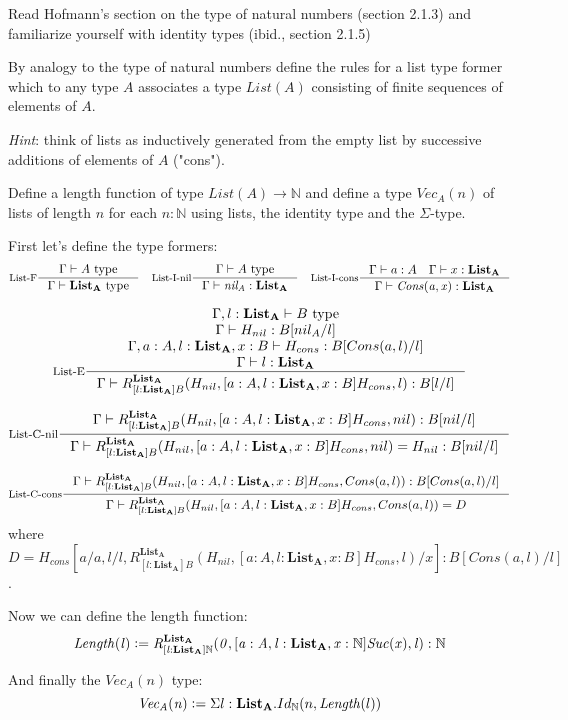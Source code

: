 \begin{exercise}
  Read Hofmann's section on the type of natural numbers (section 2.1.3) and
  familiarize yourself with identity types (ibid., section 2.1.5)

  By analogy to the type of natural numbers define the rules for a list type
  former which to any type $A$ associates a type $\mathit{List}(A)$ consisting
  of finite sequences of elements of $A$.

  \emph{Hint}: think of lists as inductively generated from the empty list by
  successive additions of elements of $A$ ("cons").

  Define a length function of type $\mathit{List}(A) \to \mathbb{N}$ and define
  a type $\mathit{Vec}_A(n)$ of lists of length $n$ for each $n : \mathbb{N}$
  using lists, the identity type and the $\Sigma$-type.
\end{exercise}
\begin{answer}
  First let's define the type formers:
  \[
    \inference[List-F]{\Gamma \vdash A ~\text{type}}{\Gamma \vdash \mathbf{List_A} ~\text{type}}\quad
    \inference[List-I-nil]{\Gamma \vdash A ~\text{type}}{\Gamma \vdash \mathit{nil_A} : \mathbf{List_A}}\quad
    \inference[List-I-cons]{\Gamma \vdash a : A \quad \Gamma \vdash x : \mathbf{List_A}}{\Gamma \vdash \mathit{Cons(a, x)} : \mathbf{List_A}}
  \]

  \[
    \inference[List-E]{
      \Gamma, l: \mathbf{List_A} \vdash B ~\text{type}\\
      \Gamma \vdash H_{nil} : B[nil_A/l]\\
      \Gamma, a : A, l : \mathbf{List_A}, x: B \vdash H_{cons} : B[Cons(a, l)/l]\\
      \Gamma \vdash l : \mathbf{List_A}
    }{\Gamma \vdash R^{\mathbf{List_A}}_{[l: \mathbf{List_A}]B}(H_{nil}, [a : A, l: \mathbf{List_A}, x : B] H_{cons}, l) : B[l/l]}
  \]

  \[
    \inference[List-C-nil]{
      \Gamma \vdash R^{\mathbf{List_A}}_{[l: \mathbf{List_A}]B}(H_{nil}, [a : A, l: \mathbf{List_A}, x: B] H_{cons}, nil) : B[nil/l]
    }{\Gamma \vdash R^{\mathbf{List_A}}_{[l: \mathbf{List_A}]B}(H_{nil}, [a : A, l: \mathbf{List_A}, x: B]H_{cons}, nil) = H_{nil} : B[nil/l]}
  \]

  \[
    \inference[List-C-cons]{
      \Gamma \vdash R^{\mathbf{List_A}}_{[l: \mathbf{List_A}]B}(H_{nil}, [a : A, l: \mathbf{List_A}, x: B] H_{cons}, Cons(a, l)) : B[Cons(a, l)/l]
    }{\Gamma \vdash R^{\mathbf{List_A}}_{[l: \mathbf{List_A}]B}(H_{nil}, [a : A, l: \mathbf{List_A}, x: B] H_{cons}, Cons(a, l)) = D}
  \]
  where $D = H_{cons}[a/a, l/l, R^{\mathbf{List_A}}_{[l: \mathbf{List_A}]B}(H_{nil}, [a : A, l: \mathbf{List_A}, x : B] H_{cons}, l)/x] : B[Cons(a, l)/l]$.

  Now we can define the length function:
  \[
    \mathit{Length(l) \vcentcolon= R^{\mathbf{List_A}}_{[l: \mathbf{List_A}]\mathbb{N}}(0, [a : A, l: \mathbf{List_A}, x : \mathbb{N}] Suc(x), l) : \mathbb{N}}
  \]

  And finally the $\mathit{Vec_A(n)}$ type:
  \[
    \mathit{Vec_A(n)} \vcentcolon= \Sigma l: \mathbf{List_A}. Id_\mathbb{N}(n, \mathit{Length}(l))
  \]
\end{answer}

